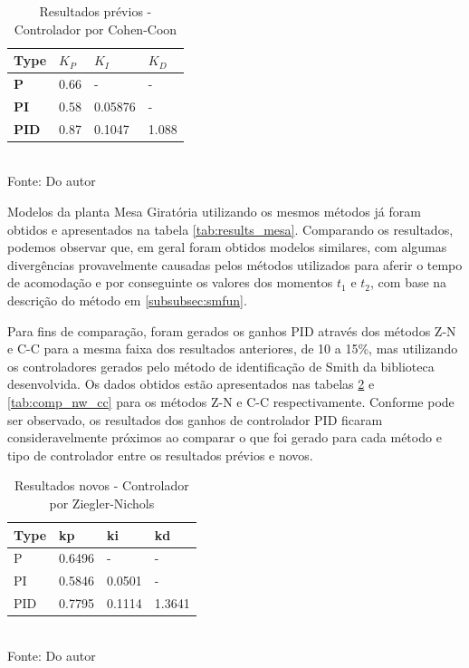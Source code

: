 \begin{table}[H]
    \caption{Resultados prévios - Controlador por Cohen-Coon}
    \centering
    \begin{tabular}{|l|l|l|l|}
        \hline
        \textbf{Type} & \textbf{$K_P$} & \textbf{$K_I$} & \textbf{$K_D$} \\
        \hline
        \textbf{P}    & 0.66           & -              & -              \\
        \hline
        \textbf{PI}   & 0.58           & 0.05876        & -              \\
        \hline
        \textbf{PID}  & 0.87           & 0.1047         & 1.088          \\
        \hline
    \end{tabular}
    \label{tab:comp_prev_cc}
    \\
    \vspace{0cm}\hspace{0cm}\small{Fonte: Do autor}
\end{table}

Modelos da planta Mesa Giratória utilizando os mesmos métodos já foram obtidos e apresentados na tabela
\ref{tab:results_mesa}.
Comparando os resultados, podemos observar que, em geral foram obtidos modelos similares, com algumas divergências
provavelmente causadas pelos métodos utilizados para aferir o tempo de acomodação e por conseguinte os valores dos
momentos $t_1$ e $t_2$, com base na descrição do método em \ref{subsubsec:smfun}.

Para fins de comparação, foram gerados os ganhos PID através dos métodos Z-N e C-C para a mesma faixa dos resultados
anteriores, de 10 a 15\%, mas utilizando os controladores gerados pelo método de identificação de Smith da biblioteca
desenvolvida.
Os dados obtidos estão apresentados nas tabelas \ref{tab:comp_nw_zn} e \ref{tab:comp_nw_cc} para os métodos
Z-N e C-C respectivamente.
Conforme pode ser observado, os resultados dos ganhos de controlador PID ficaram consideravelmente próximos ao
comparar o que foi gerado para cada método e tipo de controlador entre os resultados prévios e novos.


\begin{table}[H]
    \caption{Resultados novos - Controlador por Ziegler-Nichols}
    \centering
    \begin{tabular}{|l|l|l|l|}
        \hline
        \textbf{Type} & \textbf{kp} & \textbf{ki} & \textbf{kd} \\
        \hline
        P             & 0.6496      & -           & -           \\
        \hline
        PI            & 0.5846      & 0.0501      & -           \\
        \hline
        PID           & 0.7795      & 0.1114      & 1.3641      \\
        \hline
    \end{tabular}
    \label{tab:comp_nw_zn}
    \\
    \vspace{0cm}\hspace{0cm}\small{Fonte: Do autor}
\end{table}

